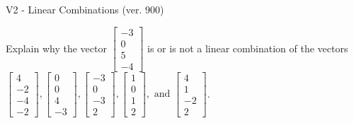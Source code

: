\begin{exercise}
  \begin{exerciseTitle}V2 - Linear Combinations (ver. 900)\end{exerciseTitle}
  \begin{exerciseStatement}
    Explain why the vector \(\left[\begin{array}{c}
-3 \\
0 \\
5 \\
-4
\end{array}\right]\)  is or is not a linear 
	combination of the vectors \(\left[\begin{array}{c}
4 \\
-2 \\
-4 \\
-2
\end{array}\right] , \left[\begin{array}{c}
0 \\
0 \\
4 \\
-3
\end{array}\right] , \left[\begin{array}{c}
-3 \\
0 \\
-3 \\
2
\end{array}\right] , \left[\begin{array}{c}
1 \\
0 \\
1 \\
2
\end{array}\right] , \text{ and } \left[\begin{array}{c}
4 \\
1 \\
-2 \\
2
\end{array}\right]\).
	



\end{exerciseStatement}
\end{exercise}
